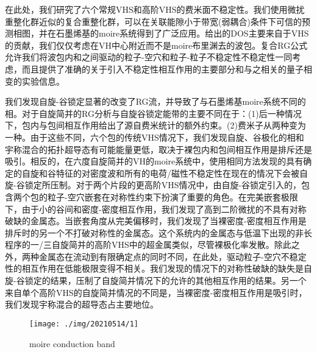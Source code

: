 \documentclass[reprint, aps, prb, showkeys]{revtex4-2}
\begin{document}
在此处，我们研究了六个常规VHS和高阶VHS的费米面不稳定性。我们使用微扰重整化群近似的复合重整化群，可以在关联能隙小于带宽(弱耦合)条件下可信的预测相图，并在石墨烯基的moire系统得到了广泛应用。给出的DOS主要来自于VHS的贡献，我们仅仅考虑在VH中心附近而不是moire布里渊去的波包。复合RG公式允许我们将波包内和之间驱动的粒子-空穴和粒子-粒子不稳定性不稳定性一同考虑，而且提供了准确的关于引入不稳定性相互作用的主要部分和与之相关的量子相变的实验信息。

我们发现自旋-谷锁定显著的改变了RG流，并导致了与石墨烯基moire系统不同的相。对于自旋简并的RG分析与自旋谷锁定能带的主要不同在于：(1)后一种情况下，包内与包间相互作用给出了源自费米统计的额外约束。(2)费米子从两种变为一种。由于这些不同，六个包的传统VHS情况下，我们发现自旋、谷极化的相和宇称混合的拓扑超导态有可能能量更低，取决于裸包内和包间相互作用是排斥还是吸引。相反的，在六度自旋简并的VH的moire系统中，使用相同方法发现的具有确定的自旋和谷特征的对密度波和所有的电荷/磁性不稳定性在现在的情况下会被自旋-谷锁定所压制。对于两个片段的更高阶VHS情况中，由自旋-谷锁定引入的，包含两个包的粒子-空穴嵌套在对称性约束下扮演了重要的角色。在完美嵌套极限下，由于小的谷间和密度-密度相互作用，我们发现了高到二阶微扰的不具有对称破缺的金属态。当嵌套角度从完美偏移时，我们发现了当裸密度-密度相互作用是排斥时的另一个不打破对称性的金属态。这个系统内的金属态与低温下出现的非长程序的一/三自旋简并的高阶VHS中的超金属类似，尽管裸极化率发散。除此之外，两种金属态在流动到有限确定点的同时不同，在此处，驱动粒子-空穴不稳定性的相互作用在低能极限变得不相关。我们发现的情况下的对称性破缺的缺失是自旋-谷锁定的结果，压制了自旋简并情况下的允许的其他相互作用的结果。另一个来自单个高阶VHS的自旋简并情况的不同是，当裸密度-密度相互作用是吸引时，我们发现宇称混合的超导态占主要地位。
\begin{figure}[t]
    \texttt{[image: ./img/20210514/1]}
    \caption{\label{fig:moire} 
    moire conduction band
    }
\end{figure}
\end{document}
